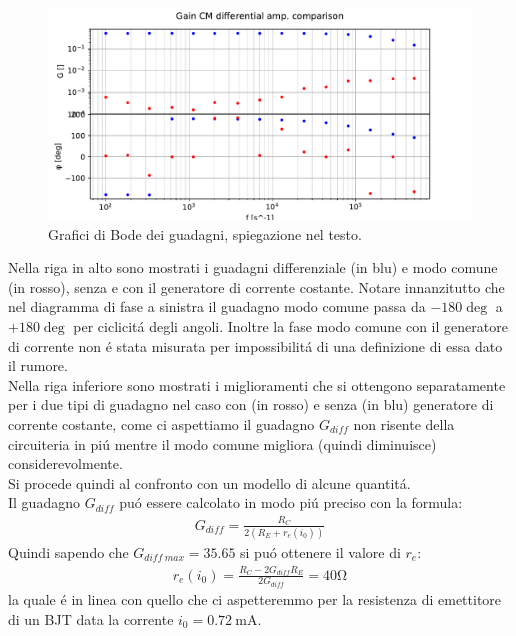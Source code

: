 \begin{figure}[H]
\begin{minipage}{0.5\textwidth}
    \end{minipage}\hfill
    \begin{minipage}{0.5\textwidth}
        \centering
        \includegraphics[width=\textwidth]{Figure_4.pdf} 
    \end{minipage}
    \caption{Grafici di Bode dei guadagni, spiegazione nel testo.}
    \label{fig:gains}
\end{figure}

Nella riga in alto sono mostrati i guadagni differenziale (in blu) e modo comune (in rosso), senza e con il generatore di corrente costante. Notare innanzitutto che nel diagramma di fase a sinistra il guadagno modo comune passa da $-180 \si{\deg}$ a $+180 \si{\deg}$ per ciclicit\'a degli angoli. Inoltre la fase modo comune con il generatore di corrente non \'e stata misurata per impossibilit\'a di una definizione di essa dato il rumore.\\
Nella riga inferiore sono mostrati i miglioramenti che si ottengono separatamente per i due tipi di guadagno nel caso con (in rosso) e senza (in blu) generatore di corrente costante, come ci aspettiamo il guadagno $G_{diff}$ non risente della circuiteria in pi\'u mentre il modo comune migliora (quindi diminuisce) considerevolmente.\\

Si procede quindi al confronto con un modello di alcune quantit\'a. \\
Il guadagno $G_{diff}$ pu\'o essere calcolato in modo pi\'u preciso con la formula:
\begin{gather}
	G_{diff}=\frac{R_C}{2(R_E+r_e(i_0))}
\end{gather}
Quindi sapendo che $G_{diff\ max}=35.65$ si pu\'o ottenere il valore di $r_e$:
\begin{gather}
	r_e(i_0)=\frac{R_C-2 G_{diff} R_E}{2 G_{diff}}=40\si{\ohm}
\end{gather}
la quale \'e in linea con quello che ci aspetteremmo per la resistenza di emettitore di un BJT data la corrente $i_0=0.72\ \si{\milli\ampere}$.

